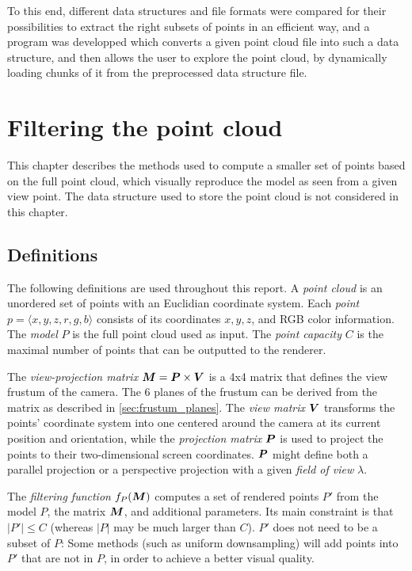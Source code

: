 \documentclass[a4paper,10pt,abstracton,notitlepage]{scrreprt}
\begin{document}
To this end, different data structures and file formats were compared for their possibilities to extract the right subsets of points in an efficient way, and a program was developped which converts a given point cloud file into such a data structure, and then allows the user to explore the point cloud, by dynamically loading chunks of it from the preprocessed data structure file.


\chapter{Filtering the point cloud}
This chapter describes the methods used to compute a smaller set of points based on the full point cloud, which visually reproduce the model as seen from a given view point. The data structure used to store the point cloud is not considered in this chapter.

\section{Definitions}
The following definitions are used throughout this report. A \emph{point cloud} is an unordered set of points with an Euclidian coordinate system. Each \emph{point} $p = \langle x, y, z, r, g, b\rangle$ consists of its coordinates $x, y, z$, and RGB color information. The \emph{model} $P$ is the full point cloud used as input. The \emph{point capacity} $C$ is the maximal number of points that can be outputted to the renderer. 

The \emph{view-projection matrix} $\matrixsym{M} = \matrixsym{P} \times \matrixsym{V}$ is a 4x4 matrix that defines the view frustum of the camera. The 6 planes of the frustum can be derived from the matrix as described in \ref{sec:frustum_planes}. The \emph{view matrix} $\matrixsym{V}$ transforms the points' coordinate system into one centered around the camera at its current position and orientation, while the \emph{projection matrix} $\matrixsym{P}$ is used to project the points to their two-dimensional screen coordinates. $\matrixsym{P}$ might define both a parallel projection or a perspective projection with a given \emph{field of view} $\lambda$.

The \emph{filtering function} $f_{P}(\matrixsym{M})$ computes a set of rendered points $P'$ from the model $P$, the matrix $\matrixsym{M}$, and additional parameters. Its main constraint is that $|P'| \leq C$ (whereas $|P|$ may be much larger than $C$). $P'$ does not need to be a subset of $P$: Some methods (such as uniform downsampling) will add points into $P'$ that are not in $P$, in order to achieve a better visual quality.
\end{document}
